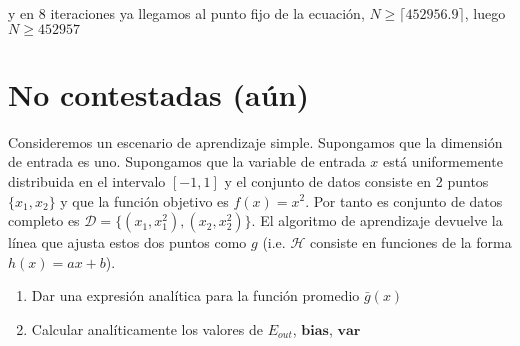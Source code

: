 \documentclass[11pt,leqno]{article}
\theoremstyle{definition}
\begin{document}
y en 8 iteraciones ya llegamos al punto fijo de la ecuación, $N \geq \lceil 452956.9 \rceil$, luego $N \geq 452957$


\section{No contestadas (aún)}

\begin{cuestion}
Consideremos un escenario de aprendizaje simple. Supongamos que la dimensión de entrada es uno. Supongamos que la variable de entrada $x$ está uniformemente distribuida en el intervalo $[-1, 1]$ y el conjunto de datos consiste en 2 puntos $\{x_1, x_2\}$ y que la función objetivo es $f(x) = x^2$. Por tanto es conjunto de datos completo es $\mathcal{D} = \{(x_1, x^2_1), (x_2 , x_2^2)\}$. El algoritmo de aprendizaje devuelve la línea que ajusta estos dos puntos como $g$ (i.e. $\mathcal{H}$ consiste en funciones de la forma $h(x) = ax + b$).
\begin{enumerate}[a]
\item Dar una expresión analítica para la función promedio $\bar{g}(x)$
\item Calcular analíticamente los valores de $E_{out}$, $\textbf{bias}$, $\textbf{var}$
\end{enumerate}
\end{cuestion}
\end{document}
